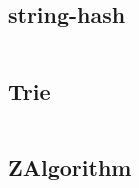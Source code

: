 \documentclass[a4]{article}
\begin{document}
\subsection{string-hash}
\inputminted[mathescape,linenos,numbersep=5pt,frame=lines,framesep=2mm]{cpp}{src/string/string-hash.cpp}
\subsection{Trie}
\inputminted[mathescape,linenos,numbersep=5pt,frame=lines,framesep=2mm]{cpp}{src/string/Trie.cpp}
\subsection{ZAlgorithm}
\inputminted[mathescape,linenos,numbersep=5pt,frame=lines,framesep=2mm]{cpp}{src/string/ZAlgorithm.cpp}

\end{document}
